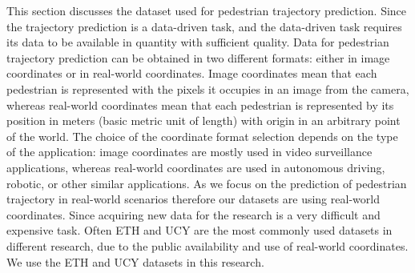 This section discusses the dataset used for pedestrian trajectory prediction. Since the trajectory prediction is a data-driven task, and the data-driven task requires its data to be available in quantity with sufficient quality. Data for pedestrian trajectory prediction can be obtained in two different formats: either in image coordinates or in real-world coordinates. Image coordinates mean that each pedestrian is represented with the pixels it occupies in an image from the camera, whereas real-world coordinates mean that each pedestrian is represented by its position in meters (basic metric unit of length) with origin in an arbitrary point of the world.\newline
The choice of the coordinate format selection depends on the type of the application: image coordinates are mostly used in video surveillance applications, whereas real-world coordinates are used in autonomous driving, robotic, or other similar applications. As we focus on the prediction of pedestrian trajectory in real-world scenarios therefore our datasets are using real-world coordinates.\newline
Since acquiring new data for the research is a very difficult and expensive task. Often ETH and UCY are the most commonly used datasets in different research, due to the public availability and use of real-world coordinates. We use the ETH and UCY datasets in this research.

